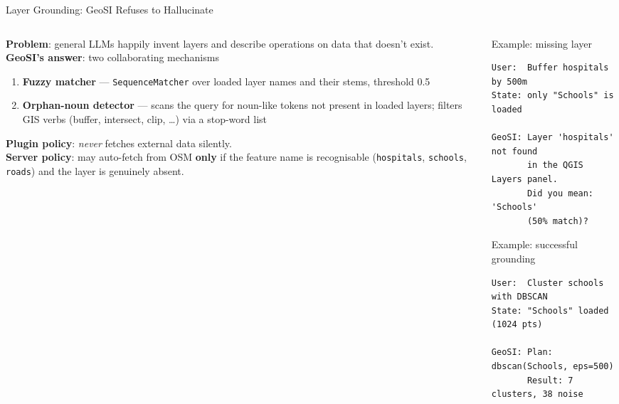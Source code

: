 \documentclass[aspectratio=169,11pt]{beamer}
\newcommand{\kw}[1]{{\color{geositeal}\bfseries #1}}
\begin{document}
\begin{frame}{Layer Grounding: GeoSI Refuses to Hallucinate}
  \begin{columns}[T,onlytextwidth]
    \begin{column}{0.5\textwidth}
      \small
      \textbf{Problem}: general LLMs happily invent layers and describe operations on data that doesn't exist.\\[0.3em]
      \textbf{GeoSI's answer}: two collaborating mechanisms
      \begin{enumerate}
        \item \kw{Fuzzy matcher} --- \texttt{SequenceMatcher} over loaded layer names and their stems, threshold 0.5
        \item \kw{Orphan-noun detector} --- scans the query for noun-like tokens not present in loaded layers; filters GIS verbs (buffer, intersect, clip, \ldots) via a stop-word list
      \end{enumerate}

      \vspace{0.3em}
      \textbf{Plugin policy}: \emph{never} fetches external data silently.\\
      \textbf{Server policy}: may auto-fetch from OSM \kw{only} if the feature name is recognisable (\texttt{hospitals}, \texttt{schools}, \texttt{roads}) and the layer is genuinely absent.
    \end{column}
    \begin{column}{0.5\textwidth}
      \begin{block}{Example: missing layer}
\begin{lstlisting}[style=chat]
User:  Buffer hospitals by 500m
State: only "Schools" is loaded

GeoSI: Layer 'hospitals' not found
       in the QGIS Layers panel.
       Did you mean: 'Schools'
       (50% match)?
\end{lstlisting}
      \end{block}
      \vspace{-0.3em}
      \begin{block}{Example: successful grounding}
\begin{lstlisting}[style=chat]
User:  Cluster schools with DBSCAN
State: "Schools" loaded (1024 pts)

GeoSI: Plan: dbscan(Schools, eps=500)
       Result: 7 clusters, 38 noise
\end{lstlisting}
      \end{block}
    \end{column}
  \end{columns}
\end{frame}
\end{document}
